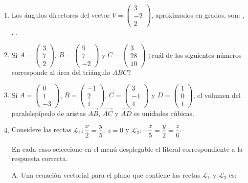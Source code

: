 \documentclass[11pt]{article}
\newcommand{\vectiii}[3]{\begin{pmatrix}#1\\#2\\#3\end{pmatrix}}
\begin{document}
\begin{enumerate}
\item[\textbf{Punto 1.}] Los ángulos directores del vector $V=\vectiii{3}{-2}{2}$, aproximados en grados, son:
\underline{\hspace{2cm}}, \underline{\hspace{2cm}}, \underline{\hspace{2cm}}.

\item[\textbf{Punto 2.}] Si $A=\vectiii{3}{7}{2}$, $B=\vectiii{9}{7}{-2}$ y $C=\vectiii{3}{28}{10}$ ¿cuál de los siguientes números corresponde al área del triángulo $ABC$?


\item[\textbf{Punto 3.}] Si $A=\vectiii{0}{1}{-3}$, $B=\vectiii{-1}{2}{1}$, $C=\vectiii{3}{-1}{4}$ y $D=\vectiii{1}{0}{1}$, el volumen del paralelepípedo de aristas $\overrightarrow{AB}$, $\overrightarrow{AC}$ y $\overrightarrow{AD}$ es \underline{\hspace{2cm}} unidades cúbicas.

\item[\textbf{Punto 4.}] Considere las rectas $\mathcal{L}_1:\dfrac{x}{2}=\dfrac{y}{5},\ z=0$ y $\mathcal{L}_2:-\dfrac{x}{5}=\dfrac{y}{2}=\dfrac{z}{6}$.

En cada caso seleccione en el menú desplegable el literal correspondiente a la respuesta correcta.

A. Una ecuación vectorial para el plano que contiene las rectas $\mathcal{L}_1$ y $\mathcal{L}_2$ es:


\end{enumerate}
\end{document}
